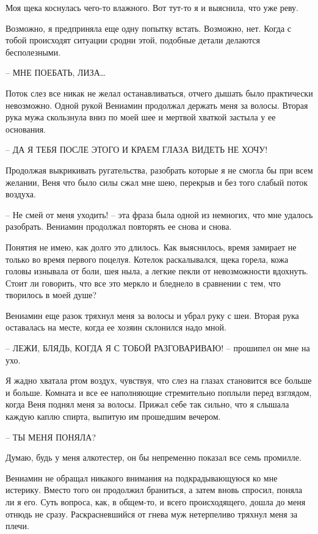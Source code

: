 \documentclass[
]{book}
\begin{document}
Моя щека коснулась чего-то влажного. Вот тут-то я и выяснила, что уже реву.

Возможно, я предприняла еще одну попытку встать. Возможно, нет. Когда с тобой происходят ситуации сродни этой, подобные детали делаются бесполезными.

-- МНЕ ПОЕБАТЬ, ЛИЗА\ldots{}

Поток слез все никак не желал останавливаться, отчего дышать было практически невозможно. Одной рукой Вениамин продолжал держать меня за волосы. Вторая рука мужа скользнула вниз по моей шее и мертвой хваткой застыла у ее основания.

-- ДА Я ТЕБЯ ПОСЛЕ ЭТОГО И КРАЕМ ГЛАЗА ВИДЕТЬ НЕ ХОЧУ!

Продолжая выкрикивать ругательства, разобрать которые я не смогла бы при всем желании, Веня что было силы сжал мне шею, перекрыв и без того слабый поток воздуха.

-- Не смей от меня уходить! -- эта фраза была одной из немногих, что мне удалось разобрать. Вениамин продолжал повторять ее снова и снова.

Понятия не имею, как долго это длилось. Как выяснилось, время замирает не только во время первого поцелуя. Котелок раскалывался, щека горела, кожа головы изнывала от боли, шея ныла, а легкие пекли от невозможности вдохнуть. Стоит ли говорить, что все это меркло и бледнело в сравнении с тем, что творилось в моей душе?

Вениамин еще разок тряхнул меня за волосы и убрал руку с шеи. Вторая рука оставалась на месте, когда ее хозяин склонился надо мной.

-- ЛЕЖИ, БЛЯДЬ, КОГДА Я С ТОБОЙ РАЗГОВАРИВАЮ! -- прошипел он мне на ухо.

Я жадно хватала ртом воздух, чувствуя, что слез на глазах становится все больше и больше. Комната и все ее наполняющие стремительно поплыли перед взглядом, когда Веня поднял меня за волосы. Прижал себе так сильно, что я слышала каждую каплю спирта, выпитую им прошедшим вечером.

-- ТЫ МЕНЯ ПОНЯЛА?

Думаю, будь у меня алкотестер, он бы непременно показал все семь промилле.

Вениамин не обращал никакого внимания на подкрадывающуюся ко мне истерику. Вместо того он продолжил браниться, а затем вновь спросил, поняла ли я его. Суть вопроса, как, в общем-то, и всего происходящего, дошла до меня отнюдь не сразу. Раскрасневшийся от гнева муж нетерпеливо тряхнул меня за плечи.
\end{document}

